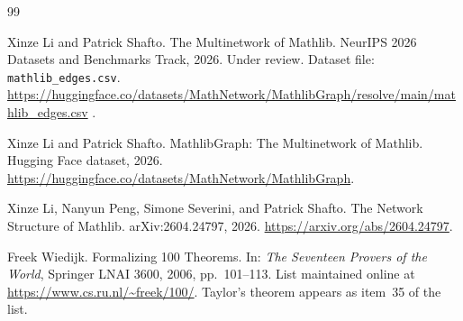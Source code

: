 \documentclass[11pt,reqno]{amsart}
\begin{document}
\begin{thebibliography}{99}
\medskip

 Xinze Li and Patrick Shafto. \newblock
The Multinetwork of Mathlib. \newblock
NeurIPS 2026 Datasets and Benchmarks Track, 2026. Under review. \newblock
Dataset file: \texttt{mathlib\_edges.csv}. \newblock
\url{https://huggingface.co/datasets/MathNetwork/MathlibGraph/resolve/main/mathlib_edges.csv}%
.

\medskip

 Xinze Li and Patrick Shafto. \newblock
MathlibGraph: The Multinetwork of Mathlib. \newblock
Hugging Face dataset, 2026. \newblock
\url{https://huggingface.co/datasets/MathNetwork/MathlibGraph}.

\medskip

 Xinze Li, Nanyun Peng, Simone Severini,
and Patrick Shafto. \newblock
The Network Structure of Mathlib. \newblock
arXiv:2604.24797, 2026. \newblock
\url{https://arxiv.org/abs/2604.24797}.

\medskip

 Freek Wiedijk. \newblock
Formalizing 100 Theorems. \newblock
In: \emph{The Seventeen Provers of the World}, Springer LNAI 3600, 2006,
pp.~101--113. \newblock
List maintained online at \url{https://www.cs.ru.nl/~freek/100/}. \newblock
Taylor's theorem appears as item~35 of the list.
\end{thebibliography}
\end{document}
